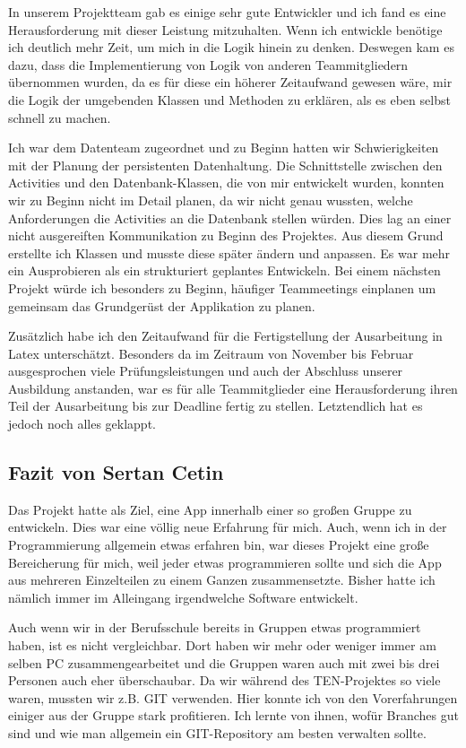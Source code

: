 In unserem Projektteam gab es einige sehr gute Entwickler und ich fand es eine Herausforderung mit dieser Leistung mitzuhalten. Wenn ich entwickle benötige ich deutlich mehr Zeit, um mich in die Logik hinein zu denken. Deswegen kam es dazu, dass die Implementierung von Logik von anderen Teammitgliedern übernommen wurden, da es für diese ein höherer Zeitaufwand gewesen wäre, mir die Logik der umgebenden Klassen und Methoden zu erklären, als es eben selbst schnell zu machen.

Ich war dem Datenteam zugeordnet und zu Beginn hatten wir Schwierigkeiten mit der Planung der persistenten Datenhaltung. Die Schnittstelle zwischen den Activities und den Datenbank-Klassen, die von mir entwickelt wurden, konnten wir zu Beginn nicht im Detail planen, da wir nicht genau wussten, welche Anforderungen die Activities an die Datenbank stellen würden. Dies lag an einer nicht ausgereiften Kommunikation zu Beginn des Projektes. Aus diesem Grund erstellte ich Klassen und musste diese später ändern und anpassen. Es war mehr ein Ausprobieren als ein strukturiert geplantes Entwickeln. Bei einem nächsten Projekt würde ich besonders zu Beginn, häufiger Teammeetings einplanen um gemeinsam das Grundgerüst der Applikation zu planen.

Zusätzlich habe ich den Zeitaufwand für die Fertigstellung der Ausarbeitung in Latex unterschätzt. Besonders da im Zeitraum von November bis Februar ausgesprochen viele Prüfungsleistungen und auch der Abschluss unserer Ausbildung anstanden, war es für alle Teammitglieder eine Herausforderung ihren Teil der Ausarbeitung bis zur Deadline fertig zu stellen. Letztendlich hat es jedoch noch alles geklappt.


\subsection{Fazit von Sertan Cetin}

Das Projekt hatte als Ziel, eine App innerhalb einer so großen Gruppe zu entwickeln. Dies war eine völlig neue Erfahrung für mich. Auch, wenn ich in der Programmierung allgemein etwas erfahren bin, war dieses Projekt eine große Bereicherung für mich, weil jeder etwas programmieren sollte und sich die App aus mehreren Einzelteilen zu einem Ganzen zusammensetzte. Bisher hatte ich nämlich immer im Alleingang irgendwelche Software entwickelt.

Auch wenn wir in der Berufsschule bereits in Gruppen etwas programmiert haben, ist es nicht vergleichbar. Dort haben wir mehr oder weniger immer am selben PC zusammengearbeitet und die Gruppen waren auch mit zwei bis drei Personen auch eher überschaubar. Da wir während des TEN-Projektes so viele waren, mussten wir z.B. GIT verwenden. Hier konnte ich von den Vorerfahrungen einiger aus der Gruppe stark profitieren. Ich lernte von ihnen, wofür Branches gut sind und wie man allgemein ein GIT-Repository am besten verwalten sollte.

